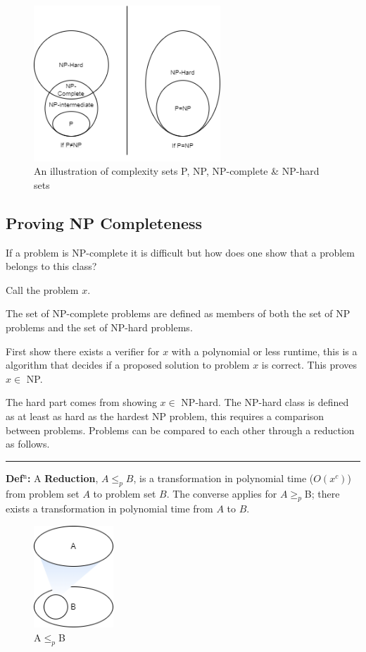 \documentclass[a4paper,11pt]{report}
\begin{document}
\begin{figure}[h!]
\begin{center}
\includegraphics[width=70mm]{figures/np.drawio.png}
\end{center}
\caption{An illustration of complexity sets P, NP, NP-complete \& NP-hard sets\label{fig:npsets}}
\end{figure}

\subsection{Proving NP Completeness}

If a problem is NP-complete it is difficult but how does one show that a problem belongs to this class? 

Call the problem $x$.

The set of NP-complete problems are defined as members of both the set of NP problems and the set of NP-hard problems. 

First show there exists a verifier for $x$ with a polynomial or less runtime, this is a algorithm that decides if a proposed solution to problem $x$ is correct. This proves $x\in$ NP.

The hard part comes from showing $x\in$ NP-hard. The NP-hard class is defined as at least as hard as the hardest NP problem, this requires a comparison between problems. Problems can be compared to each other through a reduction as follows.

\noindent\rule{4cm}{0.4pt}

\textbf{Def$^\text{n}$:} A \textbf{Reduction}, $A \leq_p B$, is a transformation in polynomial time ($O(x^c)$) from problem set $A$ to problem set $B$. The converse applies for $A\geq_p$B; there exists a transformation in polynomial time from $A$ to $B$.

\begin{figure}[h!]
\begin{center}
\includegraphics[width=30mm]{figures/reduction.png}
\end{center}
\caption{\label{fig:reduction}A$\leq_p$B}
\end{figure}
\end{document}
